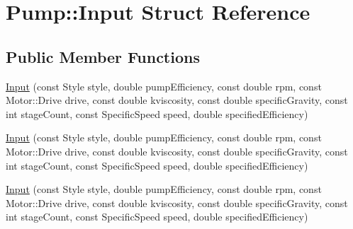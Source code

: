 \hypertarget{struct_pump_1_1_input}{}\section{Pump\+:\+:Input Struct Reference}
\label{struct_pump_1_1_input}
\subsection*{Public Member Functions}
\begin{DoxyCompactItemize}
\item 
\hyperlink{struct_pump_1_1_input_a20fa1fcd38084965d58cf9a96ea65b4a}{Input} (const Style style, double pump\+Efficiency, const double rpm, const Motor\+::\+Drive drive, const double kviscosity, const double specific\+Gravity, const int stage\+Count, const Specific\+Speed speed, double specified\+Efficiency)
\item 
\hyperlink{struct_pump_1_1_input_a20fa1fcd38084965d58cf9a96ea65b4a}{Input} (const Style style, double pump\+Efficiency, const double rpm, const Motor\+::\+Drive drive, const double kviscosity, const double specific\+Gravity, const int stage\+Count, const Specific\+Speed speed, double specified\+Efficiency)
\item 
\hyperlink{struct_pump_1_1_input_a20fa1fcd38084965d58cf9a96ea65b4a}{Input} (const Style style, double pump\+Efficiency, const double rpm, const Motor\+::\+Drive drive, const double kviscosity, const double specific\+Gravity, const int stage\+Count, const Specific\+Speed speed, double specified\+Efficiency)
\end{DoxyCompactItemize}
